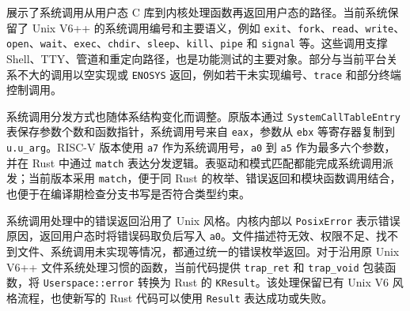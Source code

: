  展示了系统调用从用户态 C 库到内核处理函数再返回用户态的路径。当前系统保留了 Unix V6++ 的系统调用编号和主要语义，例如 \verb|exit|、\verb|fork|、\verb|read|、\verb|write|、\verb|open|、\verb|wait|、\verb|exec|、\verb|chdir|、\verb|sleep|、\verb|kill|、\verb|pipe| 和 \verb|signal| 等。这些调用支撑 Shell、TTY、管道和重定向路径，也是功能测试的主要对象。部分与当前平台关系不大的调用以空实现或 \verb|ENOSYS| 返回，例如若干未实现编号、\verb|trace| 和部分终端控制调用。

系统调用分发方式也随体系结构变化而调整。原版本通过 \verb|SystemCallTableEntry| 表保存参数个数和函数指针，系统调用号来自 \verb|eax|，参数从 \verb|ebx| 等寄存器复制到 \verb|u.u_arg|。RISC-V 版本使用 \verb|a7| 作为系统调用号，\verb|a0| 到 \verb|a5| 作为最多六个参数，并在 Rust 中通过 \verb|match| 表达分发逻辑。表驱动和模式匹配都能完成系统调用派发；当前版本采用 \verb|match|，便于同 Rust 的枚举、错误返回和模块函数调用结合，也便于在编译期检查分支书写是否符合类型约束。

系统调用处理中的错误返回沿用了 Unix 风格。内核内部以 \verb|PosixError| 表示错误原因，返回用户态时将错误码取负后写入 \verb|a0|。文件描述符无效、权限不足、找不到文件、系统调用未实现等情况，都通过统一的错误枚举返回。对于沿用原 Unix V6++ 文件系统处理习惯的函数，当前代码提供 \verb|trap_ret| 和 \verb|trap_void| 包装函数，将 \verb|Userspace::error| 转换为 Rust 的 \verb|KResult|。该处理保留已有 Unix V6 风格流程，也使新写的 Rust 代码可以使用 \verb|Result| 表达成功或失败。
